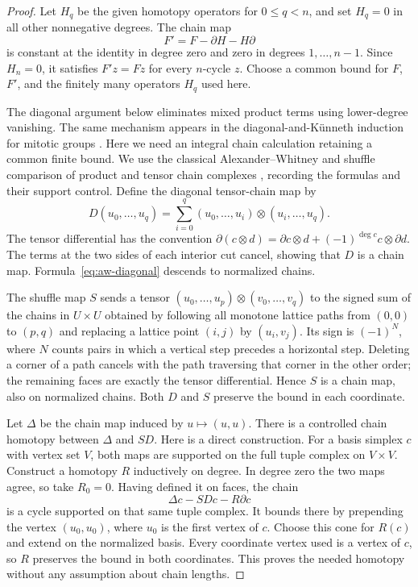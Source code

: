 \begin{proof}
Let $H_q$ be the given homotopy operators for $0\le q<n$, and set
$H_q=0$ in all other nonnegative degrees.  The chain map
\[
 F'=F-\partial H-H\partial
\]
is constant at the identity in degree zero and zero in degrees
$1,\ldots,n-1$.  Since $H_n=0$, it satisfies $F'z=Fz$ for every
$n$-cycle $z$.  Choose a common bound for $F$, $F'$, and the finitely
many operators $H_q$ used here.

The diagonal argument below eliminates mixed product terms using
lower-degree vanishing.  The same mechanism appears in the
diagonal-and-K\"unneth induction for mitotic groups
\citep[Proposition~4.1]{BDH1980}.  Here we need an integral chain
calculation retaining a common finite bound.  We use the classical
Alexander--Whitney and shuffle comparison of product and tensor
chain complexes \citep{EilenbergZilber1953}, recording the formulas
and their support control.
Define the diagonal tensor-chain map by
\begin{equation}\label{eq:aw-diagonal}
 D(u_0,\ldots,u_q)
  =\sum_{i=0}^q
       (u_0,\ldots,u_i)\otimes(u_i,\ldots,u_q).
\end{equation}
The tensor differential has the convention
$\partial(c\otimes d)=\partial c\otimes d+
(-1)^{\deg c}c\otimes\partial d$.
The terms at the two sides of each interior cut cancel, showing that
$D$ is a chain map.  Formula~\eqref{eq:aw-diagonal} descends to
normalized chains.

The shuffle map $S$ sends a tensor
$(u_0,\ldots,u_p)\otimes(v_0,\ldots,v_q)$ to the signed sum of
the chains in $U\times U$ obtained by following all monotone lattice
paths from $(0,0)$ to $(p,q)$ and replacing a lattice point $(i,j)$
by $(u_i,v_j)$.  Its sign is $(-1)^N$, where $N$ counts pairs in which
a vertical step precedes a horizontal step.  Deleting a corner of a
path cancels with the path traversing that corner in the other order;
the remaining faces are exactly the tensor differential.  Hence $S$
is a chain map, also on normalized chains.  Both $D$ and $S$ preserve
the bound in each coordinate.

Let $\Delta$ be the chain map induced by $u\mapsto(u,u)$.
There is a controlled chain homotopy between $\Delta$ and $SD$.
Here is a direct construction.  For a basis simplex $c$ with vertex
set $V$, both maps are supported on the full tuple complex on
$V\times V$.  Construct a homotopy $R$ inductively on degree.  In
degree zero the two maps agree, so take $R_0=0$.  Having defined it
on faces, the chain
\[
 \Delta c-SDc-R\partial c
\]
is a cycle supported on that same tuple complex.  It bounds there by
prepending the vertex $(u_0,u_0)$, where $u_0$ is the first vertex of
$c$.  Choose this cone for $R(c)$ and extend on the normalized basis.
Every coordinate vertex used is a vertex of $c$, so $R$ preserves
the bound in both coordinates.  This proves the needed homotopy
without any assumption about chain lengths.


\end{proof}
